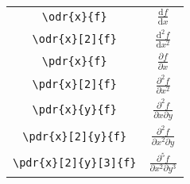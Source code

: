 \documentclass{jsarticle}
\renewcommand{\d}{\textrm{d}}
\begin{document}
%
\begin{table}[htpt]
\centering
\begin{tabular}{cc}
	\verb|\odr{x}{f}|    & $\displaystyle \frac{\d f}{\d x}$ \\[3mm]
	\verb|\odr{x}[2]{f}| & $\displaystyle \frac{\d^2 f}{\d x^2}$ \\[3mm]
	\verb|\pdr{x}{f}|    & $\displaystyle \frac{\partial f}{\partial x}$ \\[3mm]
	\verb|\pdr{x}[2]{f}| & $\displaystyle \frac{\partial^2 f}{\partial x^2}$ \\[3mm]
	\verb|\pdr{x}{y}{f}| & $\displaystyle \frac{\partial^2 f}{\partial x \partial y}$ \\[3mm]
	\verb|\pdr{x}[2]{y}{f}| & $\displaystyle \frac{\partial^2 f}{\partial x^2 \partial y}$ \\[3mm]
	\verb|\pdr{x}[2]{y}[3]{f}| & $\displaystyle \frac{\partial^5 f}{\partial x^2 \partial y^3}$ \\[3mm]
\end{tabular}
\end{table}
\end{document}
